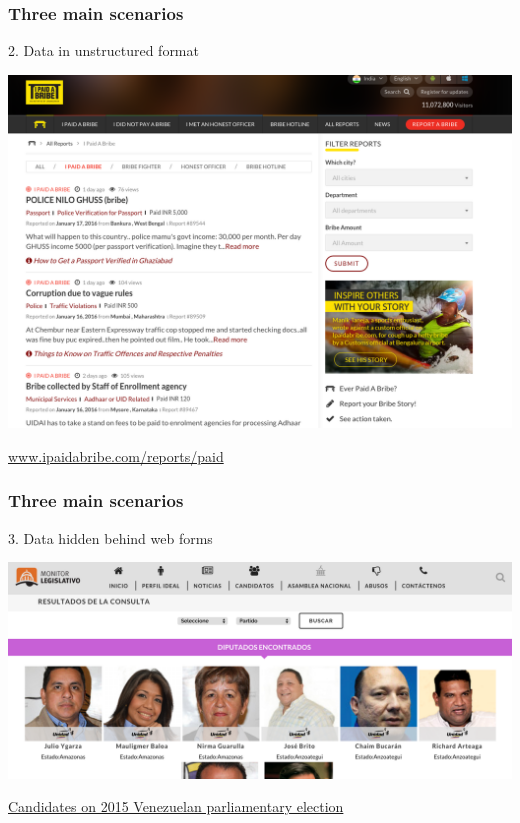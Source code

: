 \documentclass{beamer}
\begin{document}
\begin{frame}
	\frametitle{Three main scenarios}
	
	2. Data in unstructured format  \\
	\vspace{.25cm}
	
	\includegraphics[width=.9\textwidth]{figures/bribe.png}
	
	\centering\href{www.ipaidabribe.com/reports/paid}{www.ipaidabribe.com/reports/paid}
\end{frame}

\begin{frame}
	\frametitle{Three main scenarios}
	
	3. Data hidden behind web forms \\
	\vspace{.25cm}
	
	
	\includegraphics[width=\textwidth]{figures/Venezuela.png}
	
	\centering\href{http://eligetucandidato.org/filtro/}{Candidates on 2015 Venezuelan parliamentary election}
\end{frame}
\end{document}
